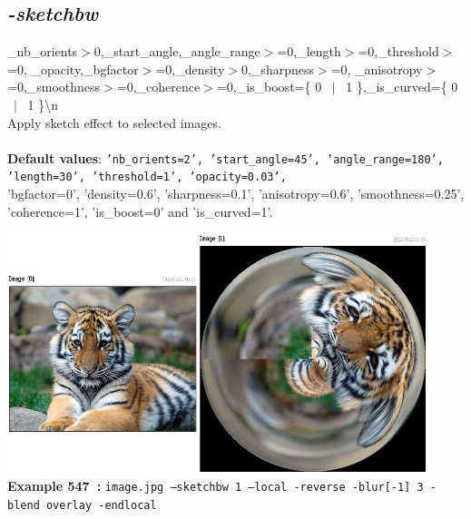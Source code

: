 \documentclass[a4paper,11pt,twoside]{book}
\begin{document}
\subsection{\emph{-sketchbw} }\vspace*{-0.5em}
\_nb\_orients$>$0,\_start\_angle,\_angle\_range$>$=0,\_length$>$=0,\_threshold$>$=0,
\_opacity,\_bgfactor$>$=0,\_density$>$0,\_sharpness$>$=0,
\_anisotropy$>$=0,\_smoothness$>$=0,\_coherence$>$=0,\_is\_boost=\{ 0 ~$|$~ 1 \},\_is\_curved=\{ 0 ~$|$~ 1 \}\textbackslash n
~\\Apply sketch effect to selected images.
~\\~\\\textbf{Default values}: {\small \texttt{'nb\_orients=2', 'start\_angle=45', 'angle\_range=180', 'length=30', 'threshold=1', 'opacity=0.03',}}
~\\'bgfactor=0', 'density=0.6', 'sharpness=0.1', 'anisotropy=0.6', 'smoothness=0.25', 'coherence=1', 'is\_boost=0' and 'is\_curved=1'.
\begin{center}\includegraphics[keepaspectratio=true,height=7cm,width=\textwidth]{img/gmic_def547.jpg}\\
{\footnotesize \textbf{Example 547~:} \texttt{image.jpg --sketchbw 1 --local -reverse -blur[-1] 3 -blend overlay -endlocal}}
\end{center}
\end{document}
